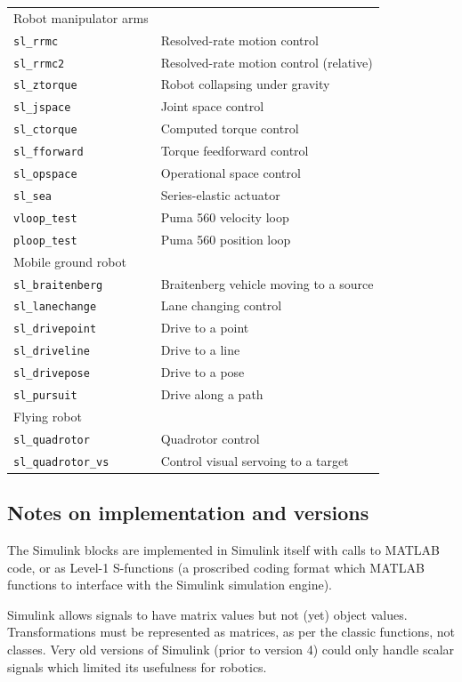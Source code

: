 \documentclass[a4paper,twoside]{report}
\begin{document}
\begin{tabular}{ll}
\cmidrule{1-1}
Robot manipulator arms \\
\texttt{sl\_rrmc} & Resolved-rate motion control  \\
\texttt{sl\_rrmc2} & Resolved-rate motion control (relative) \\
\texttt{sl\_ztorque} & Robot collapsing under gravity \\
\texttt{sl\_jspace} & Joint space control  \\
\texttt{sl\_ctorque} & Computed torque control \\
\texttt{sl\_fforward} &  Torque feedforward control\\
\texttt{sl\_opspace} & Operational space control \\
\texttt{sl\_sea} &  Series-elastic actuator \\
\texttt{vloop\_test} &  Puma 560 velocity loop \\ 
\texttt{ploop\_test} & Puma 560 position loop \\ 
\cmidrule{1-1}
Mobile ground robot\\
\texttt{sl\_braitenberg} &  Braitenberg vehicle moving to a source\\
\texttt{sl\_lanechange} &  Lane changing control \\
\texttt{sl\_drivepoint} &  Drive to a point\\
\texttt{sl\_driveline} &  Drive to a line\\
\texttt{sl\_drivepose} &  Drive to a pose\\
\texttt{sl\_pursuit} &  Drive along a path \\ 
\cmidrule{1-1}
Flying robot\\
\texttt{sl\_quadrotor} &  Quadrotor control \\
\texttt{sl\_quadrotor\_vs} &  Control visual servoing to a target
\end{tabular}


\subsection{Notes on implementation and versions}
The Simulink blocks are implemented in Simulink itself with calls to MATLAB code, or as Level-1 S-functions (a proscribed coding format which MATLAB functions
to  interface with the Simulink simulation engine).

Simulink allows signals to have matrix values but not (yet) object values.  Transformations must be represented as matrices, as per the classic functions, not classes.
Very old versions of Simulink (prior to version 4) could only handle scalar signals which limited its usefulness for robotics.
\end{document}
